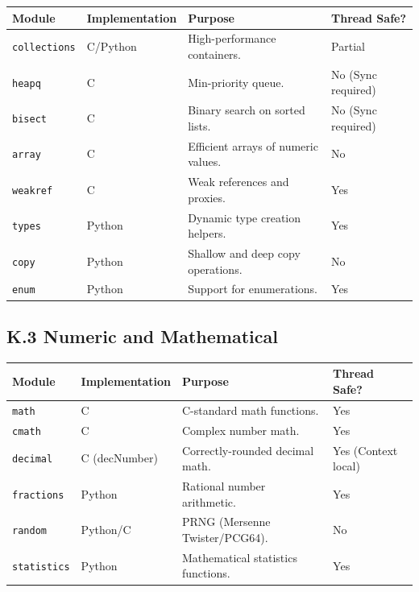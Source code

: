 \begin{longtable}[]{@{}llll@{}}
\toprule
Module & Implementation & Purpose & Thread Safe? \\
\midrule
\endhead
\passthrough{\lstinline!collections!} & C/Python & High-performance
containers. & Partial \\
\passthrough{\lstinline!heapq!} & C & Min-priority queue. & No (Sync
required) \\
\passthrough{\lstinline!bisect!} & C & Binary search on sorted lists. &
No (Sync required) \\
\passthrough{\lstinline!array!} & C & Efficient arrays of numeric
values. & No \\
\passthrough{\lstinline!weakref!} & C & Weak references and proxies. &
Yes \\
\passthrough{\lstinline!types!} & Python & Dynamic type creation
helpers. & Yes \\
\passthrough{\lstinline!copy!} & Python & Shallow and deep copy
operations. & No \\
\passthrough{\lstinline!enum!} & Python & Support for enumerations. &
Yes \\
\bottomrule
\end{longtable}

\hypertarget{k.3-numeric-and-mathematical}{%
\subsection{K.3 Numeric and
Mathematical}\label{k.3-numeric-and-mathematical}}

\begin{longtable}[]{@{}llll@{}}
\toprule
Module & Implementation & Purpose & Thread Safe? \\
\midrule
\endhead
\passthrough{\lstinline!math!} & C & C-standard math functions. & Yes \\
\passthrough{\lstinline!cmath!} & C & Complex number math. & Yes \\
\passthrough{\lstinline!decimal!} & C (decNumber) & Correctly-rounded
decimal math. & Yes (Context local) \\
\passthrough{\lstinline!fractions!} & Python & Rational number
arithmetic. & Yes \\
\passthrough{\lstinline!random!} & Python/C & PRNG (Mersenne
Twister/PCG64). & No \\
\passthrough{\lstinline!statistics!} & Python & Mathematical statistics
functions. & Yes \\
\bottomrule
\end{longtable}

